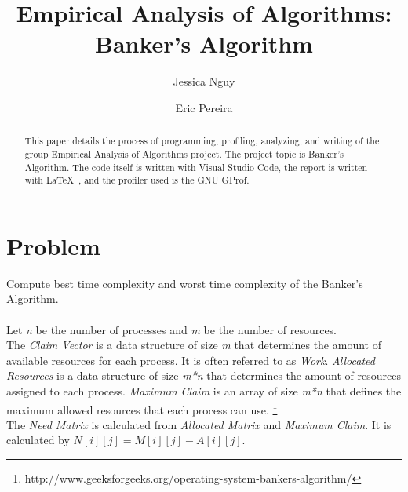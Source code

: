 \documentclass[letterpaper,oneside,10pt]{article}
\begin{document}
\pagestyle{empty} %



\title{Empirical Analysis of Algorithms: Banker's Algorithm}
\author{Jessica Nguy \and Eric Pereira}
\maketitle
\newpage



\tableofcontents %
\cleardoublepage %

\pagestyle{plain} %




\begin{abstract}
This paper details the process of programming, profiling, analyzing, and writing of the group Empirical Analysis of Algorithms project. The project topic is Banker's Algorithm. The code itself is written with Visual Studio Code, the report is written with \LaTeX\ , and the profiler used is the GNU GProf.
\end{abstract}
\newpage

\section{Problem}
Compute best time complexity and worst time complexity of the Banker's Algorithm.
\\
\\Let \textit{n} be the number of processes and \textit{m} be the number of resources.
\\The \textit{Claim Vector} is a data structure of size \textit{m} that determines the amount of available resources for each process. It is often referred to as \textit{Work}. \textit{Allocated Resources} is a data structure of size \textit{m*n} that determines the amount of resources assigned to each process. \textit{Maximum Claim} is an array of size \textit{m*n} that defines the maximum allowed resources that each process can use. \footnote{http://www.geeksforgeeks.org/operating-system-bankers-algorithm/}
\\The \textit{Need Matrix} is calculated from \textit{Allocated Matrix} and \textit{Maximum Claim}. It is calculated by $N[i][j] = M[i][j] - A[i][j]$.
\end{document}
